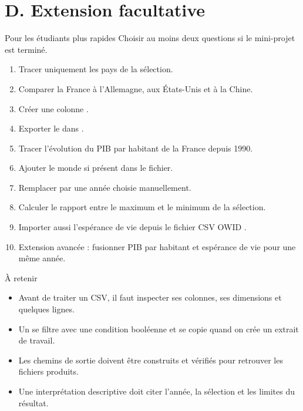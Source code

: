 \documentclass[11pt,a4paper]{article}
\begin{document}
\section*{D. Extension facultative}

\begin{extensionexercise}{Pour les étudiants plus rapides}
Choisir au moins deux questions si le mini-projet est terminé.
\begin{enumerate}
  \item Tracer uniquement les pays de la sélection.
  \item Comparer la France à l'Allemagne, aux États-Unis et à la Chine.
  \item Créer une colonne .
  \item Exporter le  dans .
  \item Tracer l'évolution du PIB par habitant de la France depuis 1990.
  \item Ajouter le monde  si présent dans le fichier.
  \item Remplacer  par une année choisie manuellement.
  \item Calculer le rapport entre le maximum et le minimum de la sélection.
  \item Importer aussi l'espérance de vie depuis le fichier CSV OWID .
  \item Extension avancée : fusionner PIB par habitant et espérance de vie pour une même année.
\end{enumerate}
\end{extensionexercise}

\begin{takeawaybox}{À retenir}
\begin{itemize}
  \item Avant de traiter un CSV, il faut inspecter ses colonnes, ses dimensions et quelques lignes.
  \item Un  se filtre avec une condition booléenne et se copie quand on crée un extrait de travail.
  \item Les chemins de sortie doivent être construits et vérifiés pour retrouver les fichiers produits.
  \item Une interprétation descriptive doit citer l'année, la sélection et les limites du résultat.
\end{itemize}
\end{takeawaybox}
\end{document}
